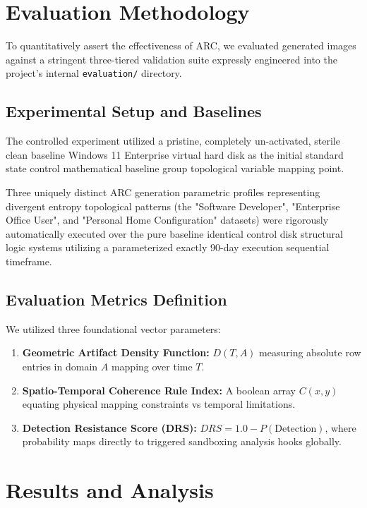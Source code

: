 \documentclass{ieeeaccess}
\begin{document}
\section{Evaluation Methodology}

To quantitatively assert the effectiveness of ARC, we evaluated generated images against a stringent three-tiered validation suite expressly engineered into the project's internal \texttt{evaluation/} directory.

\subsection{Experimental Setup and Baselines}
The controlled experiment utilized a pristine, completely un-activated, sterile clean baseline Windows 11 Enterprise virtual hard disk as the initial standard state control mathematical baseline group topological variable mapping point. 

Three uniquely distinct ARC generation parametric profiles representing divergent entropy topological patterns (the "Software Developer", "Enterprise Office User", and "Personal Home Configuration" datasets) were rigorously automatically executed over the pure baseline identical control disk structural logic systems utilizing a parameterized exactly 90-day execution sequential timeframe.

\subsection{Evaluation Metrics Definition}
We utilized three foundational vector parameters:
\begin{enumerate}
\item \textbf{Geometric Artifact Density Function:} $D(T, A)$ measuring absolute row entries in domain $A$ mapping over time $T$.
\item \textbf{Spatio-Temporal Coherence Rule Index:} A boolean array $C(x, y)$ equating physical mapping constraints vs temporal limitations.
\item \textbf{Detection Resistance Score (DRS):} $DRS = 1.0 - P(\text{Detection})$, where probability maps directly to triggered sandboxing analysis hooks globally.
\end{enumerate}

\section{Results and Analysis}
\end{document}
